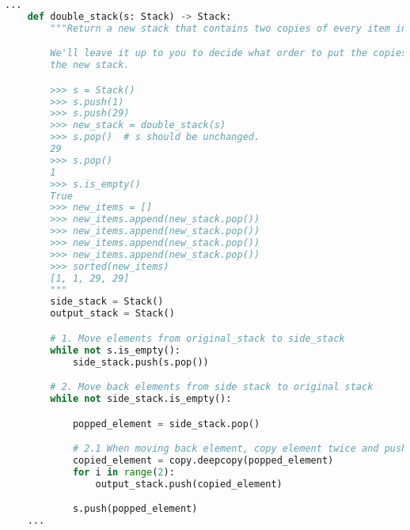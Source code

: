 \documentclass[12pt]{article}
\begin{document}
\begin{enumerate}[1.]
    \bigskip

    \begin{lstlisting}[language=Python,caption={task\_1\_q2\_solution.py},captionpos=b]
    ...
    def double_stack(s: Stack) -> Stack:
        """Return a new stack that contains two copies of every item in <stack>.

        We'll leave it up to you to decide what order to put the copies into in
        the new stack.

        >>> s = Stack()
        >>> s.push(1)
        >>> s.push(29)
        >>> new_stack = double_stack(s)
        >>> s.pop()  # s should be unchanged.
        29
        >>> s.pop()
        1
        >>> s.is_empty()
        True
        >>> new_items = []
        >>> new_items.append(new_stack.pop())
        >>> new_items.append(new_stack.pop())
        >>> new_items.append(new_stack.pop())
        >>> new_items.append(new_stack.pop())
        >>> sorted(new_items)
        [1, 1, 29, 29]
        """
        side_stack = Stack()
        output_stack = Stack()

        # 1. Move elements from original_stack to side_stack
        while not s.is_empty():
            side_stack.push(s.pop())

        # 2. Move back elements from side stack to original stack
        while not side_stack.is_empty():

            popped_element = side_stack.pop()

            # 2.1 When moving back element, copy element twice and push to output_stack
            copied_element = copy.deepcopy(popped_element)
            for i in range(2):
                output_stack.push(copied_element)

            s.push(popped_element)
    ...
    \end{lstlisting}
\end{enumerate}

\bigskip
\end{document}
